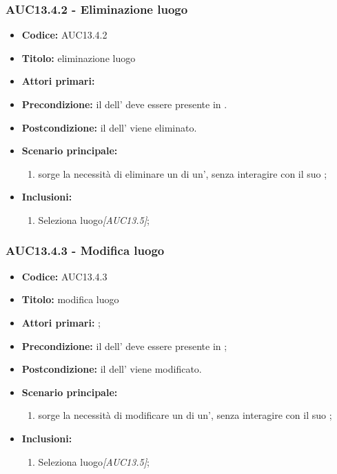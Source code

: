 \documentclass[casi-duso]{subfiles}
\begin{document}
\subsubsection{AUC13.4.2 - Eliminazione luogo}
\label{subsub:AUC13.4.2}
\begin{itemize}
  \item \textbf{Codice:} AUC13.4.2
  \item \textbf{Titolo:} eliminazione luogo
  \item \textbf{Attori primari:} 
  \item \textbf{Precondizione:} il  dell' deve essere presente in .
  \item \textbf{Postcondizione:} il  dell' viene eliminato.
  \item \textbf{Scenario principale:}
  \begin{enumerate}
    \item sorge la necessità di eliminare un  di un', senza interagire con il suo ;
  \end{enumerate}
  \item \textbf{Inclusioni:}
  \begin{enumerate}
    \item Seleziona luogo\emph{[AUC13.5]};
  \end{enumerate}
\end{itemize}

\subsubsection{AUC13.4.3 - Modifica luogo}
\label{subsub:AUC13.4.3}
\begin{itemize}
  \item \textbf{Codice:} AUC13.4.3
  \item \textbf{Titolo:} modifica luogo
  \item \textbf{Attori primari:} ;
  \item \textbf{Precondizione:} il  dell' deve essere presente in ;
  \item \textbf{Postcondizione:} il  dell' viene modificato.
  \item \textbf{Scenario principale:}
  \begin{enumerate}
    \item sorge la necessità di modificare un  di un', senza interagire con il suo ;
  \end{enumerate}
  \item \textbf{Inclusioni:}
  \begin{enumerate}
    \item Seleziona luogo\emph{[AUC13.5]};
  \end{enumerate}
\end{itemize}
\end{document}
